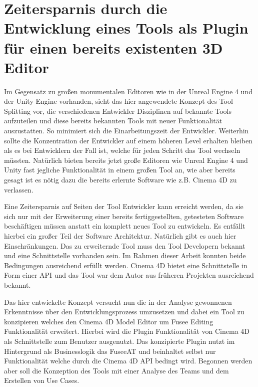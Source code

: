 \documentclass[pagesize, paper=a4, fontsize=12pt, titlepage=true, headings=small, headnosepline, abstractoff, liststotoc, nochapterprefix, plainheadsepline, twoside]{scrreprt}
\begin{document}
\section{Zeitersparnis durch die Entwicklung eines Tools als Plugin für einen bereits existenten 3D Editor}
Im Gegensatz zu großen monumentalen Editoren wie in der Unreal Engine 4 und der Unity Engine vorhanden, sieht das hier angewendete Konzept des Tool Splitting vor, die verschiedenen Entwickler Disziplinen auf bekannte Tools aufzuteilen und diese bereits bekannten Tools mit neuer Funktionalität auszustatten. So minimiert sich die Einarbeitungszeit der Entwickler. Weiterhin sollte die Konzentration der Entwickler auf einem höheren Level erhalten bleiben als es bei Entwicklern der Fall ist, welche für jeden Schritt das Tool wechseln müssten. Natürlich bieten bereits jetzt große Editoren wie Unreal Engine 4 und Unity fast jegliche Funktionalität in einem großen Tool an, wie aber bereits gesagt ist es nötig dazu die bereits erlernte Software wie z.B. Cinema 4D zu verlassen.

Eine Zeitersparnis auf Seiten der Tool Entwickler kann erreicht werden, da sie sich nur mit der Erweiterung einer bereits fertiggestellten, getesteten Software beschäftigen müssen anstatt ein komplett neues Tool zu entwickeln. Es entfällt hierbei ein großer Teil der Software Architektur. Natürlich gibt es auch hier Einschränkungen. Das zu erweiternde Tool muss den Tool Developern bekannt und eine Schnittstelle vorhanden sein. Im Rahmen dieser Arbeit konnten beide Bedingungen ausreichend erfüllt werden. Cinema 4D bietet eine Schnittstelle in Form einer API und das Tool war dem Autor aus früheren Projekten ausreichend bekannt.

Das hier entwickelte Konzept versucht nun die in der Analyse gewonnenen Erkenntnisse über den Entwicklungsprozess umzusetzen und dabei ein Tool zu konzipieren welches den Cinema 4D Model Editor um Fusee Editing Funktionalität erweitert. Hierbei wird die Plugin Funktionalität von Cinema 4D als Schnittstelle zum Benutzer ausgenutzt. Das konzipierte Plugin nutzt im Hintergrund als Businesslogik das FuseeAT und beinhaltet selbst nur Funktionalität welche durch die Cinema 4D API bedingt wird. Begonnen werden aber soll die Konzeption des Tools mit einer Analyse des Teams und dem Erstellen von Use Cases.
\end{document}
